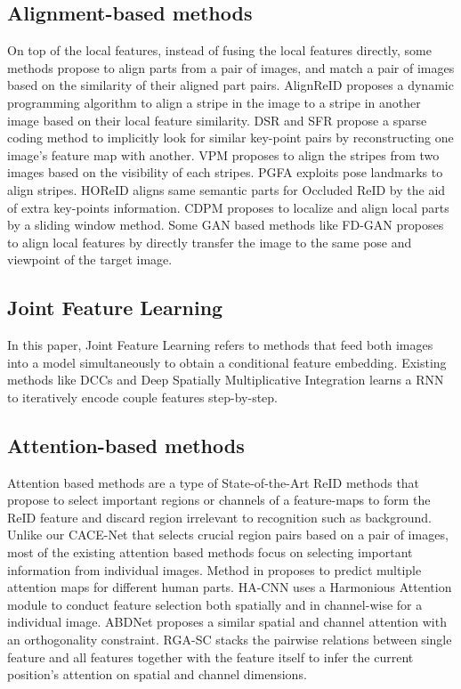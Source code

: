 \documentclass[final]{cvpr}
\begin{document}
\subsection{Alignment-based methods}
On top of the local features, instead of fusing the local features directly, some methods propose to align parts from a pair of images, and match a pair of images based on the similarity of their aligned part pairs. AlignReID\cite{zhang2017alignedreid} proposes  a dynamic programming algorithm to align a stripe in the image to a stripe in another image based on their local feature similarity. DSR \cite{he2018deep} and SFR \cite{he2018recognizing} propose a sparse coding method to implicitly look for similar key-point pairs by reconstructing one image's feature map with another. VPM \cite{sun2019perceive} proposes to align the stripes from two images based on the visibility of each stripes. PGFA \cite{miao2019pose} exploits pose landmarks to align stripes. HOReID \cite{wang2020high} aligns same semantic parts for Occluded ReID  by the aid of extra key-points information. CDPM \cite{wang2019cdpm} proposes to localize and align local parts by a sliding window method. Some GAN based methods like FD-GAN \cite{ge2018fd}  proposes to align local features by directly transfer the image to the same pose and viewpoint of the target image.  

\subsection{Joint Feature Learning}
In this paper, Joint Feature Learning refers to methods that feed both images into a model simultaneously to obtain a conditional feature embedding. 
Existing methods like DCCs \cite{wu2020deep} and Deep Spatially Multiplicative Integration \cite{wu2018and} learns a RNN to iteratively encode couple features step-by-step.


\subsection{Attention-based methods}
Attention based methods are a type of State-of-the-Art ReID methods that propose to select important regions or channels of a feature-maps to form the ReID feature and discard region irrelevant to recognition such as background. Unlike our CACE-Net that selects crucial region pairs based on a pair of images, most of the existing attention based methods focus on selecting important information from individual images. Method in \cite{Zhao_2017_ICCV} proposes to predict multiple attention maps for different human parts.  HA-CNN \cite{Li_2018_CVPR} 
uses a Harmonious Attention module to conduct feature selection both spatially and in channel-wise for a individual image. ABDNet \cite{chen2019abd} proposes a similar spatial and channel attention with an orthogonality constraint. RGA-SC \cite{zhang2020relation} stacks the pairwise relations between single feature and all features together with the feature itself to infer the current position’s attention on spatial and channel dimensions.
\end{document}

